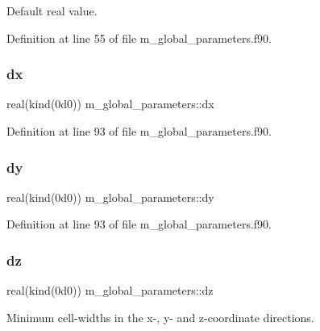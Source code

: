 Default real value. 



Definition at line 55 of file m\+\_\+global\+\_\+parameters.\+f90.

\mbox{\label{namespacem__global__parameters_aaa9a08d5b90f48e0f6bb64c209fd89e4}} 
\subsubsection{\texorpdfstring{dx}{dx}}
{\footnotesize\ttfamily real(kind(0d0)) m\+\_\+global\+\_\+parameters\+::dx}



Definition at line 93 of file m\+\_\+global\+\_\+parameters.\+f90.

\mbox{\label{namespacem__global__parameters_a5ff5660b10330ad917331259642e8dc4}} 
\subsubsection{\texorpdfstring{dy}{dy}}
{\footnotesize\ttfamily real(kind(0d0)) m\+\_\+global\+\_\+parameters\+::dy}



Definition at line 93 of file m\+\_\+global\+\_\+parameters.\+f90.

\mbox{\label{namespacem__global__parameters_ab930758827576d5cf2518679bf670351}} 
\subsubsection{\texorpdfstring{dz}{dz}}
{\footnotesize\ttfamily real(kind(0d0)) m\+\_\+global\+\_\+parameters\+::dz}



Minimum cell-\/widths in the x-\/, y-\/ and z-\/coordinate directions. 



